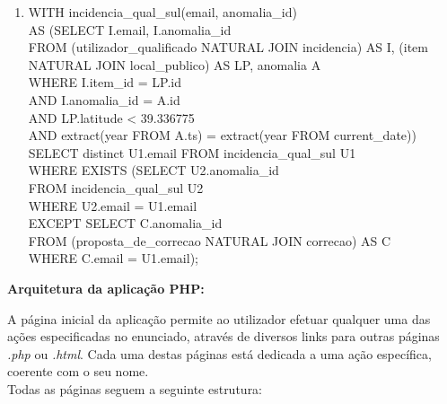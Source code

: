 \documentclass[12pt]{report}
\begin{document}
\begin{enumerate}
        \item WITH incidencia\_qual\_sul(email, anomalia\_id)\\
              AS (SELECT I.email, I.anomalia\_id \\
              FROM (utilizador\_qualificado NATURAL JOIN incidencia) AS I, (item NATURAL JOIN local\_publico) AS LP, anomalia A \\
              \hspace*{1em} WHERE I.item\_id = LP.id \\
              \hspace*{1em} AND I.anomalia\_id = A.id \\
              \hspace*{1em} AND LP.latitude < 39.336775\\
              \hspace*{1em} AND extract(year FROM A.ts) = extract(year FROM current\_date))\\
              SELECT distinct U1.email FROM incidencia\_qual\_sul U1 \\
              WHERE EXISTS (SELECT U2.anomalia\_id \\
              FROM incidencia\_qual\_sul U2 \\
              WHERE U2.email = U1.email \\
              EXCEPT SELECT C.anomalia\_id \\
              FROM (proposta\_de\_correcao NATURAL JOIN correcao) AS C \\
              WHERE C.email = U1.email);
        
    \end{enumerate}

    \newpage
    \Large 
    \textbf{Arquitetura da aplicação PHP:}

    \normalsize
    \vspace{2mm}

    \hspace*{1em}
    A página inicial da aplicação permite ao utilizador efetuar qualquer uma das ações especificadas no enunciado, através de diversos links para outras páginas \textit{.php} ou \textit{.html}. Cada uma destas páginas está dedicada a uma ação específica, coerente com o seu nome. \\
    
    \hspace*{1em} Todas as páginas seguem a seguinte estrutura:
    \\
    
\end{document}
